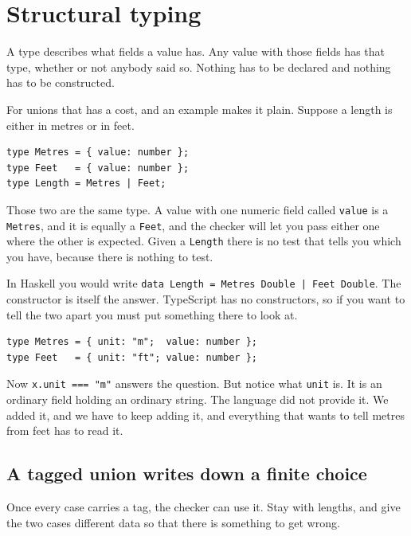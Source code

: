 \documentclass[11pt,a4paper]{article}
\begin{document}
\newpage

\section{Structural typing}
\label{sec:structural}

\begin{sectionbox}
A type describes what fields a value has. Any value with those fields has that type, whether or
not anybody said so. Nothing has to be declared and nothing has to be constructed.
\end{sectionbox}

For unions that has a cost, and an example makes it plain. Suppose a length is either in metres
or in feet.

\begin{lstlisting}[language=TS]
type Metres = { value: number };
type Feet   = { value: number };
type Length = Metres | Feet;
\end{lstlisting}

Those two are the same type. A value with one numeric field called \texttt{value} is a
\texttt{Metres}, and it is equally a \texttt{Feet}, and the checker will let you pass either one
where the other is expected. Given a \texttt{Length} there is no test that tells you which you
have, because there is nothing to test.

In Haskell you would write \texttt{data Length = Metres Double | Feet Double}. The constructor is
itself the answer. TypeScript has no constructors, so if you want to tell the two apart you must
put something there to look at.

\begin{lstlisting}[language=TS]
type Metres = { unit: "m";  value: number };
type Feet   = { unit: "ft"; value: number };
\end{lstlisting}

Now \texttt{x.unit === "m"} answers the question. But notice what \texttt{unit} is. It is an
ordinary field holding an ordinary string. The language did not provide it. We added it, and we
have to keep adding it, and everything that wants to tell metres from feet has to read it.

\subsection{A tagged union writes down a finite choice}

Once every case carries a tag, the checker can use it. Stay with lengths, and give the two cases
different data so that there is something to get wrong.
\end{document}
